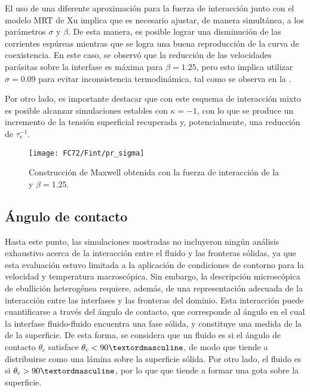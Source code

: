 El uso de una diferente aproximaci\'on para la fuerza de interacci\'on junto con el modelo MRT de Xu implica que es necesario ajustar, de manera simult\'anea, a los par\'ametros $\sigma$ y $\beta$. De esta manera, es posible lograr una disminuci\'on de las corrientes esp\'ureas mientras que se logra una buena reproducci\'on de la curva de coexistencia. En este caso, se observ\'o que la reducci\'on de las velocidades par\'asitas sobre la interfase es m\'axima para $\beta=1.25$, pero esto implica utilizar $\sigma=0.09$ para evitar inconsistencia termodin\'amica, tal como se observa en la .

Por otro lado, es importante destacar que con este esquema de interacci\'on mixto es posible alcanzar simulaciones estables con $\kappa=-1$, con lo que se produce un incremento de la tensi\'on superficial recuperada y, potencialmente, una reducci\'on de $\tau_v^{-1}$.

\begin{figure}[ht]
	\centering
	\texttt{[image: FC72/Fint/pr\_sigma]}
	\caption{Construcci\'on de Maxwell obtenida con la fuerza de interacci\'on de la  y $\beta=1.25$. }
	\label{fig:pr_sigma_beta}
\end{figure}
\FloatBarrier



\subsection{\'Angulo de contacto}

Hasta este punto, las simulaciones mostradas no incluyeron ning\'un an\'alisis exhaustivo acerca de la interacci\'on entre el fluido y las fronteras s\'olidas, ya que esta evaluaci\'on estuvo limitada a la aplicaci\'on de condiciones de contorno para la velocidad y temperatura macrosc\'opica. Sin embargo, la descripci\'on microsc\'opica de ebullici\'on heterog\'enea requiere, adem\'as, de una representaci\'on adecuada de la interacci\'on entre las interfases y las fronteras del dominio. Esta interacci\'on puede cuantificarse a trav\'es del \'angulo de contacto, que corresponde al \'angulo en el cual la interfase fluido-fluido encuentra una fase s\'olida, y constituye una medida de la  de la superficie. De esta forma, se considera que un fluido es  si el \'angulo de contacto $\theta_c$ satisface $\theta_c < 90 \textordmasculine$, de modo que tiende a distribuirse como una l\'amina sobre la superficie s\'olida. Por otro lado, el fluido es  si $\theta_c > 90 \textordmasculine$, por lo que que tiende a formar una gota sobre la superficie.


